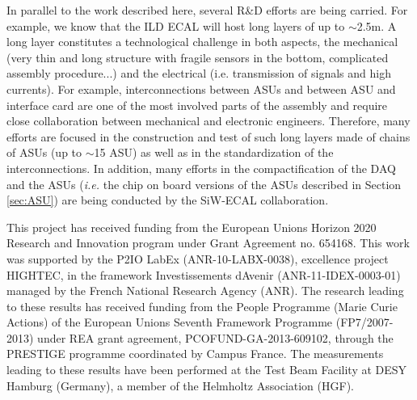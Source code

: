 \documentclass[a4paper,11pt]{article}
\begin{document}
In parallel to the work described here, several R\&D efforts are being carried.
For example, we know that the ILD ECAL will host long layers of up to $\sim$2.5m.
A long layer constitutes a technological challenge in both aspects, the mechanical
(very thin and long structure with fragile sensors in the bottom, complicated assembly procedure...)
and the electrical (i.e. transmission of signals and high currents).
For example, interconnections between ASUs and between ASU and interface card are one of
the most involved parts of the assembly
and require close collaboration between mechanical and electronic engineers.
Therefore, many efforts are focused in the construction and test of such long 
layers made of chains of ASUs (up to $\sim$15 ASU) 
as well as in the standardization of the interconnections. 
In addition, many efforts in the compactification of
the DAQ and the ASUs ({\it i.e.} the chip on board versions of the 
ASUs described in Section \ref{sec:ASU}) are being
conducted by the SiW-ECAL collaboration.


\acknowledgments

This project has received funding from the European Union{\textquotesingle}s Horizon 2020 Research and Innovation program under Grant Agreement no. 654168.
This work was supported by the P2IO LabEx (ANR-10-LABX-0038), excellence project HIGHTEC,
in the framework {\textquotesingle}Investissements d{\textquotesingle}Avenir{\textquotesingle}
(ANR-11-IDEX-0003-01) managed by the French National Research Agency (ANR).
The research leading to these results has received funding from the People Programme (Marie
Curie Actions) of the European Union{\textquotesingle}s Seventh Framework Programme (FP7/2007-2013)
under REA grant agreement, PCOFUND-GA-2013-609102, through the PRESTIGE
programme coordinated by Campus France.
The measurements leading to these results have been performed at the Test Beam Facility at DESY Hamburg (Germany), a member of the Helmholtz Association (HGF).





\end{document}
